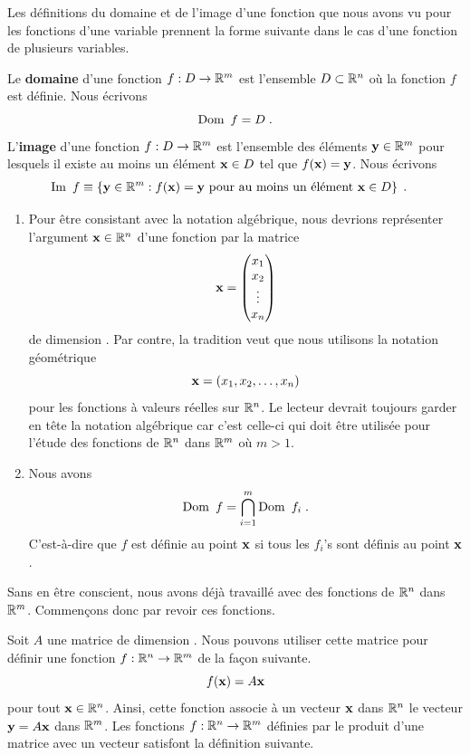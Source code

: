 {Les définitions du domaine et de l'image d'une fonction que nous avons
vu pour les fonctions d'une variable prennent la forme suivante dans
le cas d'une fonction de plusieurs variables.

\begin{defn}
Le {\bfseries domaine} d'une fonction
$f:D \rightarrow \mathbb{R}^m$ est l'ensemble $D \subset \mathbb{R}^n$ où la fonction $f$
est définie.  Nous écrivons
\[
\DO f = D \; .
\]
L'{\bfseries image} d'une fonction $f:D \rightarrow \mathbb{R}^m$ est
l'ensemble des éléments $\mathbf{y} \in \mathbb{R}^m$ pour lesquels il existe au
moins un élément $\mathbf{x} \in D$ tel que $f(\mathbf{x}) = \mathbf{y}$.
  Nous écrivons
\begin{align*}
\IM f &\equiv \left\{ \VEC{y} \in \RR^m : f(\VEC{x}) = \VEC{y}
\text{ pour au moins un élément } \VEC{x} \in D \right\} \; .
\end{align*}
\end{defn}

\begin{rmkList}
\begin{enumerate}
\item Pour être consistant avec la notation algébrique, nous devrions
représenter l'argument $\mathbf{x} \in \mathbb{R}^n$ d'une fonction par la matrice
\[
\mathbf{x} = \begin{pmatrix} x_1 \\ x_2 \\ \vdots \\ x_n
\end{pmatrix}
\]
de dimension .  Par contre, la tradition veut que nous
utilisons la notation géométrique
\[
\mathbf{x} = \left(x_1 , x_2 , \ldots , x_n \right)
\]
pour les fonctions à valeurs réelles sur $\mathbb{R}^n$.  Le lecteur devrait
toujours garder en tête la notation algébrique car c'est celle-ci qui
doit être utilisée pour l'étude des fonctions de $\mathbb{R}^n$ dans $\mathbb{R}^m$
où $m>1$.
\item Nous avons
\[
\DO f = \bigcap_{i=1}^m \DO f_i \; .
\]
C'est-à-dire que $f$ est définie au point $\mathbf{x}$ si tous les
$f_i$'s sont définis au point $\mathbf{x}$.
\end{enumerate}
\end{rmkList}

Sans en être conscient, nous avons déjà travaillé avec des fonctions
de $\mathbb{R}^n$ dans $\mathbb{R}^m$.  Commençons donc par revoir ces fonctions.

Soit $A$ une matrice de dimension .  Nous pouvons utiliser cette
matrice pour définir une fonction $f:\mathbb{R}^n\rightarrow \mathbb{R}^m$ de la
façon suivante.
\[
f(\mathbf{x}) = A\mathbf{x}
\]
pour tout $\mathbf{x} \in \mathbb{R}^n$.  Ainsi, cette fonction associe à un
vecteur $\mathbf{x}$ dans $\mathbb{R}^n$ le vecteur $\mathbf{y} = A\mathbf{x}$ dans
$\mathbb{R}^m$.  Les fonctions $f:\mathbb{R}^n\rightarrow \mathbb{R}^m$ définies par le
produit d'une matrice avec un vecteur satisfont la définition
suivante.

}
